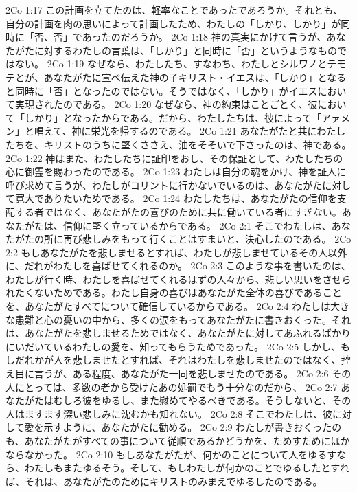2Co 1:17  この計画を立てたのは、軽率なことであったであろうか。それとも、自分の計画を肉の思いによって計画したため、わたしの「しかり、しかり」が同時に「否、否」であったのだろうか。
2Co 1:18  神の真実にかけて言うが、あなたがたに対するわたしの言葉は、「しかり」と同時に「否」というようなものではない。
2Co 1:19  なぜなら、わたしたち、すなわち、わたしとシルワノとテモテとが、あなたがたに宣べ伝えた神の子キリスト・イエスは、「しかり」となると同時に「否」となったのではない。そうではなく、「しかり」がイエスにおいて実現されたのである。
2Co 1:20  なぜなら、神の約束はことごとく、彼において「しかり」となったからである。だから、わたしたちは、彼によって「アァメン」と唱えて、神に栄光を帰するのである。
2Co 1:21  あなたがたと共にわたしたちを、キリストのうちに堅くささえ、油をそそいで下さったのは、神である。
2Co 1:22  神はまた、わたしたちに証印をおし、その保証として、わたしたちの心に御霊を賜わったのである。
2Co 1:23  わたしは自分の魂をかけ、神を証人に呼び求めて言うが、わたしがコリントに行かないでいるのは、あなたがたに対して寛大でありたいためである。
2Co 1:24  わたしたちは、あなたがたの信仰を支配する者ではなく、あなたがたの喜びのために共に働いている者にすぎない。あなたがたは、信仰に堅く立っているからである。
2Co 2:1  そこでわたしは、あなたがたの所に再び悲しみをもって行くことはすまいと、決心したのである。
2Co 2:2  もしあなたがたを悲しませるとすれば、わたしが悲しませているその人以外に、だれがわたしを喜ばせてくれるのか。
2Co 2:3  このような事を書いたのは、わたしが行く時、わたしを喜ばせてくれるはずの人々から、悲しい思いをさせられたくないためである。わたし自身の喜びはあなたがた全体の喜びであることを、あなたがたすべてについて確信しているからである。
2Co 2:4  わたしは大きな患難と心の憂いの中から、多くの涙をもってあなたがたに書きおくった。それは、あなたがたを悲しませるためではなく、あなたがたに対してあふれるばかりにいだいているわたしの愛を、知ってもらうためであった。
2Co 2:5  しかし、もしだれかが人を悲しませたとすれば、それはわたしを悲しませたのではなく、控え目に言うが、ある程度、あなたがた一同を悲しませたのである。
2Co 2:6  その人にとっては、多数の者から受けたあの処罰でもう十分なのだから、
2Co 2:7  あなたがたはむしろ彼をゆるし、また慰めてやるべきである。そうしないと、その人はますます深い悲しみに沈むかも知れない。
2Co 2:8  そこでわたしは、彼に対して愛を示すように、あなたがたに勧める。
2Co 2:9  わたしが書きおくったのも、あなたがたがすべての事について従順であるかどうかを、ためすためにほかならなかった。
2Co 2:10  もしあなたがたが、何かのことについて人をゆるすなら、わたしもまたゆるそう。そして、もしわたしが何かのことでゆるしたとすれば、それは、あなたがたのためにキリストのみまえでゆるしたのである。
